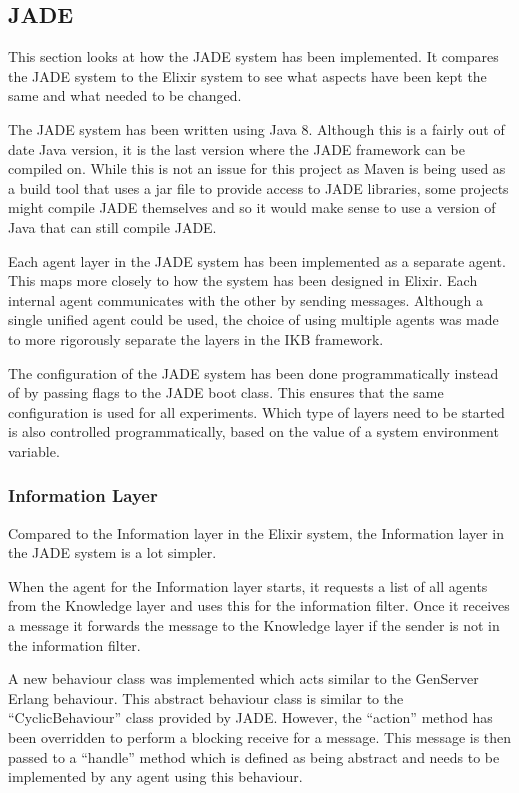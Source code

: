\subsection{JADE}

This section looks at how the JADE system has been implemented.
It compares the JADE system to the Elixir system to see what aspects have been kept the same and what needed to be changed.

The JADE system has been written using Java 8.
Although this is a fairly out of date Java version, it is the last version where the JADE framework can be compiled on.
While this is not an issue for this project as Maven is being used as a build tool that uses a jar file to provide access to JADE libraries, some projects might compile JADE themselves and so it would make sense to use a version of Java that can still compile JADE\@.

Each agent layer in the JADE system has been implemented as a separate agent.
This maps more closely to how the system has been designed in Elixir.
Each internal agent communicates with the other by sending messages.
Although a single unified agent could be used, the choice of using multiple agents was made to more rigorously separate the layers in the IKB framework.

The configuration of the JADE system has been done programmatically instead of by passing flags to the JADE boot class.
This ensures that the same configuration is used for all experiments.
Which type of layers need to be started is also controlled programmatically, based on the value of a system environment variable.

\subsubsection{Information Layer}

Compared to the Information layer in the Elixir system, the Information layer in the JADE system is a lot simpler.

When the agent for the Information layer starts, it requests a list of all agents from the Knowledge layer and uses this for the information filter.
Once it receives a message it forwards the message to the Knowledge layer if the sender is not in the information filter.

A new behaviour class was implemented which acts similar to the GenServer Erlang behaviour.
This abstract behaviour class is similar to the ``CyclicBehaviour'' class provided by JADE\@.
However, the ``action'' method has been overridden to perform a blocking receive for a message.
This message is then passed to a ``handle'' method which is defined as being abstract and needs to be implemented by any agent using this behaviour.

